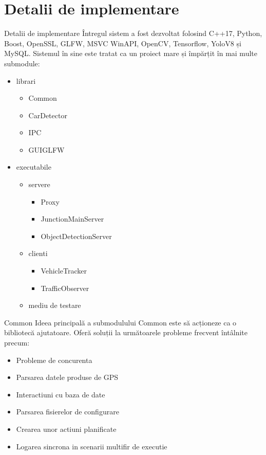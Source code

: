\documentclass{beamer}
\begin{document}
\section{Detalii de implementare}
    \begin{frame}{Detalii de implementare}
        Întregul sistem a fost dezvoltat folosind C++17, Python, Boost, OpenSSL, GLFW,
        MSVC WinAPI, OpenCV, Tensorflow, YoloV8 și MySQL. Sistemul în sine este
        tratat ca un proiect mare și împărțit în mai multe submodule: 

    \begin{itemize}
        \item librari
        \begin{itemize}
            \item Common
            \item CarDetector
            \item IPC
            \item GUIGLFW
        \end{itemize}
        
        \item executabile
        \begin{itemize}
            \item servere
            \begin{itemize}
                \item Proxy
                \item JunctionMainServer
                \item ObjectDetectionServer
            \end{itemize}
            \item  clienti
            \begin{itemize}
                \item VehicleTracker
                \item TrafficObserver
            \end{itemize}
            \item mediu de testare
        \end{itemize}
    \end{itemize}
    \end{frame}

    \begin{frame}{Common}
        Ideea principală a submodulului Common este să acționeze ca o
        bibliotecă ajutatoare. Oferă soluții la următoarele
        probleme frecvent întâlnite precum:
        \begin{itemize}
            \item Probleme de concurenta
            \item Parsarea datele produse de GPS 
            \item Interactiuni cu baza de date
            \item Parsarea fisierelor de configurare
            \item Crearea unor actiuni planificate
            \item Logarea sincrona in scenarii multifir de executie
        \end{itemize}
    \end{frame}
\end{document}

